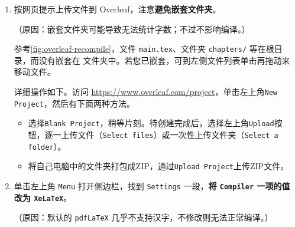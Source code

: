 \begin{enumerate}
  \item 按网页提示上传文件到 Overleaf，注意\textbf{避免嵌套文件夹}。

    （原因：嵌套文件夹可能导致无法统计字数；不过不影响编译。）

    参考\cref{fig:overleaf-recompile}，文件 \texttt{main.tex}、文件夹 \texttt{chapters/} 等在根目录，而没有嵌套在  文件夹中。若您已嵌套，可到左侧文件列表单击再拖动来移动文件。

    详细操作如下。访问 \url{https://www.overleaf.com/project}，单击左上角\texttt{New Project}，然后有下面两种方法。

    \begin{itemize}
      \item 选择\texttt{Blank Project}，稍等片刻。待创建完成后，选择左上角\texttt{Upload}按钮，逐一上传文件（\texttt{Select files}）或一次性上传文件夹（\texttt{Select a folder}）。
      \item 将自己电脑中的文件夹打包成ZIP，通过\texttt{Upload Project}上传ZIP文件。
    \end{itemize}

  \item 单击左上角 \texttt{Menu} 打开侧边栏，找到 \texttt{Settings} 一段，\textbf{将 \texttt{Compiler} 一项的值改为 \texttt{XeLaTeX}}。

    （原因：默认的 \texttt{pdfLaTeX} 几乎不支持汉字，不修改则无法正常编译。）
\end{enumerate}
